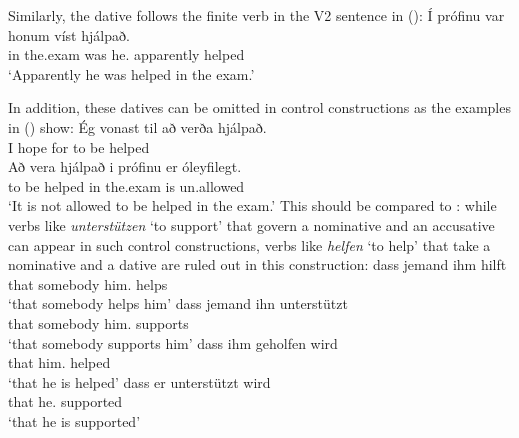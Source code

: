 \noindent
Similarly, the dative follows the finite verb in the V2 sentence in ():
\ea
\gll Í prófinu  var honum víst hjálpað.\\
     in the.exam was he.\DAT{} apparently helped\\\icelandic
\glt `Apparently he was helped in the exam.'
\z

\noindent
In addition, these datives can be omitted in control constructions as the examples in () show:
\eal
\ex
\gll Ég vonast til að verða hjálpað.\\
     I  hope   for to be helped\\\icelandic
\ex
\gll Að vera hjálpað i prófinu er óleyfilegt.\\
     to be helped in the.exam is un.allowed\\
\glt `It is not allowed to be helped in the exam.'
\zl
This should be compared to : while verbs like \emph{unterstützen} `to support' that govern a
nominative and an accusative can appear in such control constructions, verbs like \emph{helfen} `to
help' that take a nominative and a dative are ruled out in this construction:
\eal
\ex 
\gll dass jemand ihm hilft\\
     that somebody him.\DAT{} helps\\\german
\glt `that somebody helps him'
\ex
\gll dass jemand ihn unterstützt\\
     that somebody him.\ACC{} supports\\
\glt `that somebody supports him'
\ex
\gll  dass ihm geholfen wird\\
      that him.\DAT{} helped \AUX\\
\glt `that he is helped'
\ex
\gll  dass er unterstützt wird\\
      that he.\NOM{} supported \AUX\\
\glt `that he is supported'
\zl

